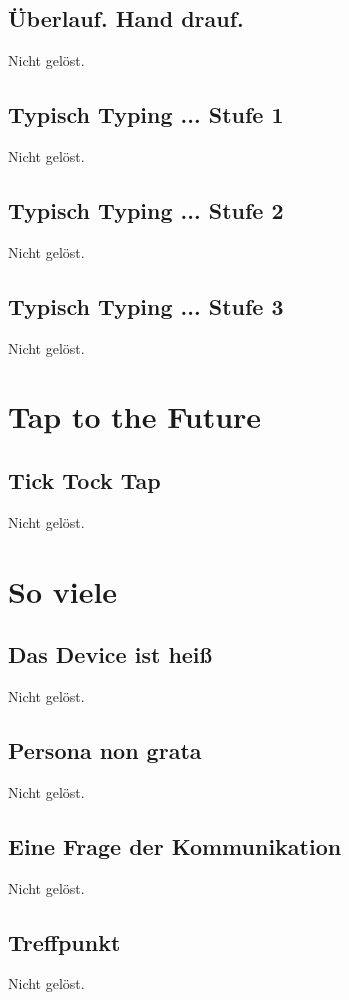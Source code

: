 \documentclass[12pt, a4paper, titlepage, oneside]{scrartcl}
\begin{document}
	\subsection{\"Uberlauf. Hand drauf.}
	Nicht gelöst.

	\subsection{Typisch Typing ... Stufe 1}
	Nicht gelöst.

	\subsection{Typisch Typing ... Stufe 2}
	Nicht gelöst.

	\subsection{Typisch Typing ... Stufe 3}
	Nicht gelöst.

	\section{Tap to the Future}

	\subsection{Tick Tock Tap}
	Nicht gelöst.

	\section{So viele}

	\subsection{Das Device ist heiß}
	Nicht gelöst.

	\subsection{Persona non grata}
	Nicht gelöst.

	\subsection{Eine Frage der Kommunikation}
	Nicht gelöst.

	\subsection{Treffpunkt}
	Nicht gelöst.
\end{document}
